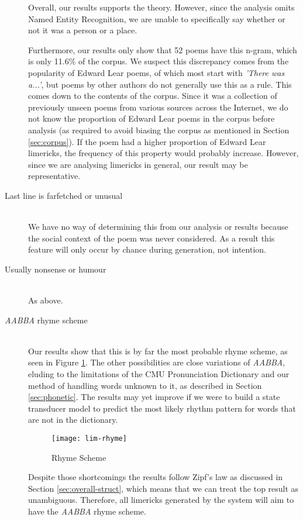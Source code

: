 \begin{description}
Overall, our results supports the theory. However, since the analysis omits Named Entity Recognition, we are unable to specifically say whether or not it was a person or a place.

Furthermore, our results only show that 52 poems have this n-gram, which is only 11.6\% of the corpus. We suspect this discrepancy comes from the popularity of Edward Lear poems, of which most start with \textit{'There was a...'}, but poems by other authors do not generally use this as a rule. This comes down to the contents of the corpus. Since it was a collection of previously unseen poems from various sources across the Internet, we do not know the proportion of Edward Lear poems in the corpus before analysis (as required to avoid biasing the corpus as mentioned in Section \ref{sec:corpus}). If the poem had a higher proportion of Edward Lear limericks, the frequency of this property would probably increase. However, since we are analysing limericks in general, our result may be representative.

\item[Last line is farfetched or unusual]  \hfill \\
We have no way of determining this from our analysis or results because the social context of the poem was never considered. As a result this feature will only occur by chance during generation, not intention.

\item[Usually nonsense or humour]  \hfill \\
As above.

\item[\textit{AABBA} rhyme scheme]  \hfill \\
Our results show that this is by far the most probable rhyme scheme, as seen in Figure \ref{fig:lim-rhyme}. The other possibilities are close variations of \textit{AABBA}, eluding to the limitations of the CMU Pronunciation Dictionary and our method of handling words unknown to it, as described in Section \ref{sec:phonetic}. The results may yet improve if we were to build a state transducer model to predict the most likely rhythm pattern for words that are not in the dictionary.

\begin{figure}[H]
\centering
\texttt{[image: lim-rhyme]}
\caption{Rhyme Scheme}
\label{fig:lim-rhyme}
\end{figure}

Despite those shortcomings the results follow Zipf's law as discussed in Section \ref{sec:overall-struct}, which means that we can treat the top result as unambiguous. Therefore, all limericks generated by the system will aim to have the \textit{AABBA} rhyme scheme.


\end{description}
